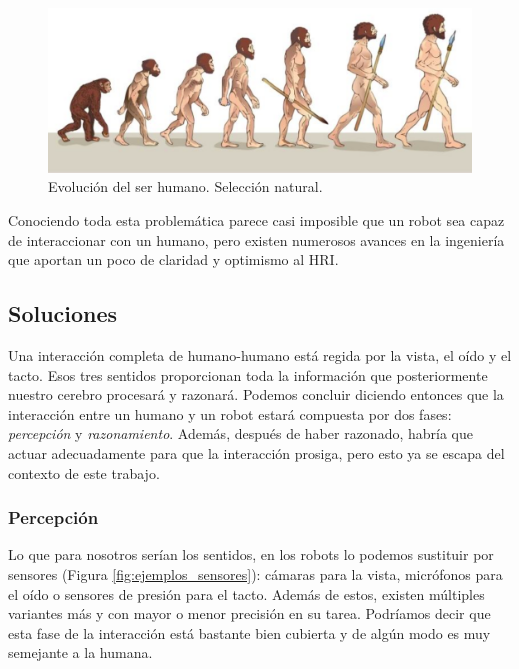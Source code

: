 \begin{figure} [h!]
  \begin{center}
    \includegraphics[width=13cm]{figs/evolucion_humana.png}
  \end{center}
  \caption{Evolución del ser humano. Selección natural.}
  \label{fig:evolucion_humana}
\end{figure}

Conociendo toda esta problemática parece casi imposible que un robot sea capaz de interaccionar con un humano, pero existen numerosos avances en la ingeniería que aportan un poco de claridad y optimismo al HRI.

\subsection{Soluciones}

Una interacción completa de humano-humano está regida por la vista, el oído y el tacto. Esos tres sentidos proporcionan toda la información que posteriormente nuestro cerebro procesará y razonará. Podemos concluir diciendo entonces que la interacción entre un humano y un robot estará compuesta por dos fases: \textit{percepción} y \textit{razonamiento}. Además, después de haber razonado, habría que actuar adecuadamente para que la interacción prosiga, pero esto ya se escapa del contexto de este trabajo. 

\subsubsection{Percepción}
\label{sec:percepcion}

Lo que para nosotros serían los sentidos, en los robots lo podemos sustituir por sensores (Figura \ref{fig:ejemplos_sensores}): cámaras para la vista, micrófonos para el oído o sensores de presión para el tacto. Además de estos, existen múltiples variantes más y con mayor o menor precisión en su tarea. Podríamos decir que esta fase de la interacción está bastante bien cubierta y de algún modo es muy semejante a la humana.\\

